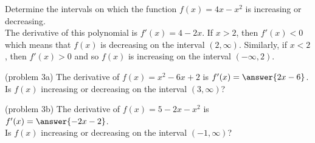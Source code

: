 \documentclass[handout]{ximera}
\begin{document}
\begin{example}[example 3]
Determine the intervals on which the function $f(x) = 4x - x^2$ is increasing or decreasing.\\
The derivative of this polynomial is $f'(x) = 4 -  2x$. If $x > 2$, then $f'(x) <0$ 
which means that $f(x)$ is decreasing on the interval $(2, \infty)$.
Similarly, if $x<2$, then $f'(x) >0$ and so $f(x)$ is increasing on the interval $(-\infty, 2)$.
\begin{image}
\end{image}

\end{example}

\begin{problem}(problem 3a)
The derivative of $f(x)=x^2 - 6x + 2$ is $f'(x) = \answer{2x-6}$.\\
Is $f(x)$ increasing or decreasing on the interval $(3, \infty)$?
\begin{multipleChoice}
\end{multipleChoice}
\end{problem}


\begin{problem}(problem 3b)
The derivative of $f(x)=5 - 2x - x^2$ is $f'(x) = \answer{-2x-2}$.\\
Is $f(x)$ increasing or decreasing on the interval $(-1, \infty)$?
\begin{multipleChoice}
\end{multipleChoice}
\end{problem}
\end{document}
